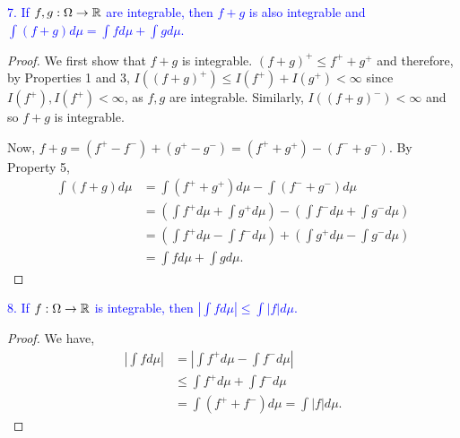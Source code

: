 \textcolor{blue}{7. If $f, g: \Omega \to \mathbb{R}$ are integrable, then $f + g$ is also integrable and $\int (f + g) d\mu = \int fd\mu + \int gd\mu$.}
\begin{proof}
    We first show that $f + g$ is integrable. $(f + g)^+ \leq f^+ + g^+$ and therefore, by Properties 1 and 3, $I((f + g)^+) \leq I(f^+) + I(g^+)< \infty$ since $I(f^+), I(f^+) < \infty$, as $f, g$ are integrable. Similarly, $I((f + g)^-) < \infty$ and so $f + g$ is integrable.

    Now, $f + g = (f^+ - f^-) + (g^+ - g^-) = (f^+ + g^+) - (f^- + g^-)$. By Property 5,
    \begin{align*}
        \int(f + g) d\mu &= \int (f^+ + g^+)d\mu - \int(f^- + g^-)d\mu \\
        &= \left( \int f^+ d\mu + \int g^+ d\mu \right) - \left( \int f^- d\mu + \int g^- d\mu \right) \tag{by Property 3}\\
        &= \left( \int f^+ d \mu - \int f^- d \mu\right) + \left( \int g^+ d \mu - \int g^- d \mu\right) \\
        &= \int fd\mu + \int gd\mu.
    \end{align*}
\end{proof}

\textcolor{blue}{8. If $f: \Omega \to \mathbb{R}$ is integrable, then $|\int fd\mu| \leq \int|f| d\mu$.}
\begin{proof}
    We have,
    \begin{align*}
    \left|\int f d\mu\right| &= \left|\int f^+ d\mu - \int f^-d\mu\right| \\
    &\leq \int f^+ d\mu + \int f^-d\mu \\
    &= \int(f^+ + f^-) d\mu = \int |f| d\mu.
    \end{align*}    
\end{proof}

